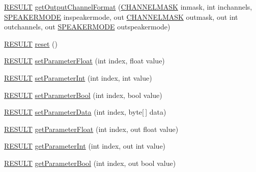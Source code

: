 \begin{DoxyCompactItemize}
\item 
\hyperlink{namespace_f_m_o_d_a305d1176ef3f8c8815861a60407ac33d}{R\+E\+S\+U\+LT} \hyperlink{class_f_m_o_d_1_1_d_s_p_a14c95c99fc6698bb176a85cb4d380036}{get\+Output\+Channel\+Format} (\hyperlink{namespace_f_m_o_d_ae295945ff00acb5f2e5ef0b3f217f5e2}{C\+H\+A\+N\+N\+E\+L\+M\+A\+SK} inmask, int inchannels, \hyperlink{namespace_f_m_o_d_aa0732e7e8efd3b96b526a7f2f8479634}{S\+P\+E\+A\+K\+E\+R\+M\+O\+DE} inspeakermode, out \hyperlink{namespace_f_m_o_d_ae295945ff00acb5f2e5ef0b3f217f5e2}{C\+H\+A\+N\+N\+E\+L\+M\+A\+SK} outmask, out int outchannels, out \hyperlink{namespace_f_m_o_d_aa0732e7e8efd3b96b526a7f2f8479634}{S\+P\+E\+A\+K\+E\+R\+M\+O\+DE} outspeakermode)
\item 
\hyperlink{namespace_f_m_o_d_a305d1176ef3f8c8815861a60407ac33d}{R\+E\+S\+U\+LT} \hyperlink{class_f_m_o_d_1_1_d_s_p_a9d60931bf4c560ff79a28e48ff7da66d}{reset} ()
\item 
\hyperlink{namespace_f_m_o_d_a305d1176ef3f8c8815861a60407ac33d}{R\+E\+S\+U\+LT} \hyperlink{class_f_m_o_d_1_1_d_s_p_aaa3b811b9eaf31dad15e695cf2770645}{set\+Parameter\+Float} (int index, float value)
\item 
\hyperlink{namespace_f_m_o_d_a305d1176ef3f8c8815861a60407ac33d}{R\+E\+S\+U\+LT} \hyperlink{class_f_m_o_d_1_1_d_s_p_a8d8a5a568001f1df253d1842393187ac}{set\+Parameter\+Int} (int index, int value)
\item 
\hyperlink{namespace_f_m_o_d_a305d1176ef3f8c8815861a60407ac33d}{R\+E\+S\+U\+LT} \hyperlink{class_f_m_o_d_1_1_d_s_p_a3a9e7406668ed5b8a6b3d2d402901741}{set\+Parameter\+Bool} (int index, bool value)
\item 
\hyperlink{namespace_f_m_o_d_a305d1176ef3f8c8815861a60407ac33d}{R\+E\+S\+U\+LT} \hyperlink{class_f_m_o_d_1_1_d_s_p_aed93a25cbab0c186134d5725e761315b}{set\+Parameter\+Data} (int index, byte\mbox{[}$\,$\mbox{]} data)
\item 
\hyperlink{namespace_f_m_o_d_a305d1176ef3f8c8815861a60407ac33d}{R\+E\+S\+U\+LT} \hyperlink{class_f_m_o_d_1_1_d_s_p_a126a21495cfc47d5a7782779f58bf2fd}{get\+Parameter\+Float} (int index, out float value)
\item 
\hyperlink{namespace_f_m_o_d_a305d1176ef3f8c8815861a60407ac33d}{R\+E\+S\+U\+LT} \hyperlink{class_f_m_o_d_1_1_d_s_p_a93b5432794048642c905e41eaeb3566c}{get\+Parameter\+Int} (int index, out int value)
\item 
\hyperlink{namespace_f_m_o_d_a305d1176ef3f8c8815861a60407ac33d}{R\+E\+S\+U\+LT} \hyperlink{class_f_m_o_d_1_1_d_s_p_acc04bea0fdec2a13b8c2109ab99a9f7e}{get\+Parameter\+Bool} (int index, out bool value)

\end{DoxyCompactItemize}
